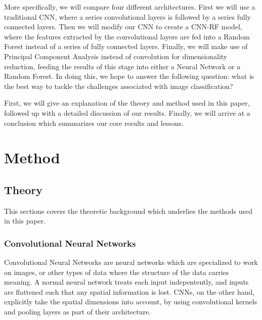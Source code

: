 \documentclass[onecolumn,10pt,cleanfoot]{asme2ej}
\begin{document}
More specifically, we will compare four different architectures. First we will use a traditional CNN, where a series convolutional layers is followed by a series fully connected layers. Then we will modify our CNN to create a CNN-RF model, where the features extracted by the convolutional layers are fed into a Random Forest instead of a series of fully connected layers. Finally, we will make use of Principal Component Analysis instead of convolution for dimensionality reduction, feeding the results of this stage into either a Neural Network or a Random Forest. In doing this, we hope to answer the following question: what is the best way to tackle the challenges associated with image classification?


First, we will give an explanation of the theory and method used in this paper, followed up with a detailed discussion of our results. Finally, we will arrive at a conclusion which summarizes our core results and lessons.

\section{Method}

\subsection{Theory}

This sections covers the theoretic background which underlies the methods used in this paper.

\subsubsection{Convolutional Neural Networks}

Convolutional Neural Networks are neural networks which are specialized to work on images, or other types of data where the structure of the data carries meaning. A normal neural network treats each input indepentently, and inputs are flattened such that any spatial information is lost. CNNs, on the other hand, explicitly take the spatial dimensions into account, by using convolutional kernels and pooling layers as part of their architecture.
\end{document}
